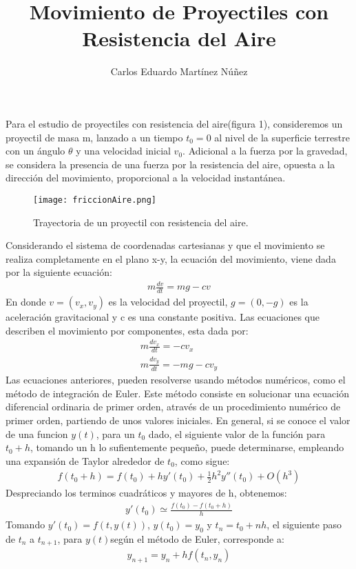 \documentclass[12pt,a4paper,twoside]{article}
\author{Carlos Eduardo Martínez Núñez}
\title{\textbf{Movimiento de Proyectiles con Resistencia del Aire}}
\begin{document}
\maketitle
Para el estudio de proyectiles con resistencia del aire(figura 1), consideremos un proyectil de masa m, lanzado a un tiempo $t_{0}=0$ al nivel de la superficie terrestre con un ángulo $\theta$ y una velocidad inicial $v_{0}$. Adicional a la fuerza por la gravedad, se considera la presencia de una fuerza por la resistencia del aire, opuesta a la dirección del movimiento, proporcional a la velocidad instantánea.
\begin{figure}[htbp]
\centering
\texttt{[image: friccionAire.png]}
\caption{Trayectoria de un proyectil con resistencia del aire.}\label{fig:figura1}
\end{figure}

Considerando el sistema de coordenadas cartesianas y que el movimiento se realiza completamente en el plano x-y, la ecuación del movimiento, viene dada por la siguiente ecuación:
\begin{eqnarray}
m\frac{dv}{dt}=mg-cv
\end{eqnarray}
En donde $v=(v_{x},v_{y})$ es la velocidad del proyectil, $g=(0,-g)$ es la aceleración gravitacional y c es una constante positiva. Las ecuaciones que describen el movimiento por componentes, esta dada por:
\begin{eqnarray}
m\frac{dv_{x}}{dt}=-cv_{x}\nonumber\\
m\frac{dv_{y}}{dt}=-mg-cv_{y}
\end{eqnarray}
 Las ecuaciones anteriores, pueden resolverse usando métodos numéricos,
como el método de integración de Euler. Este método consiste en solucionar una ecuación diferencial ordinaria de primer orden, através de un procedimiento numérico de primer orden, partiendo de unos valores iniciales. 
En general, si se conoce el valor de una funcion $y(t)$, para un $t_{0}$ dado, el siguiente valor de la función para $t_{0}+h$, tomando un h lo sufientemente pequeño, puede  determinarse, empleando una expansión de Taylor alrededor de $t_{0}$, como sigue:
\begin{eqnarray}
f(t_{0}+h)=f(t_{0})+hy'(t_{0})+\frac{1}{2}h^{2}y''(t_{0})+O(h^{3})
\end{eqnarray}
Despreciando los terminos cuadráticos y mayores de h, obtenemos:
\begin{eqnarray}
y'(t_{0})\simeq\frac{f(t_{0})-f(t_{0}+h)}{h}
\end{eqnarray}
Tomando $y'(t_{0})=f(t,y(t))$, $y(t_{0})=y_{0}$ y $t_{n}=t_{0}+nh$, el siguiente paso de $t_{n}$ a $t_{n+1}$, para $y(t)$según el método de Euler, corresponde a:
\begin{eqnarray}
y_{n+1}=y_{n}+hf(t_{n},y_{n})
\end{eqnarray}
\end{document}
